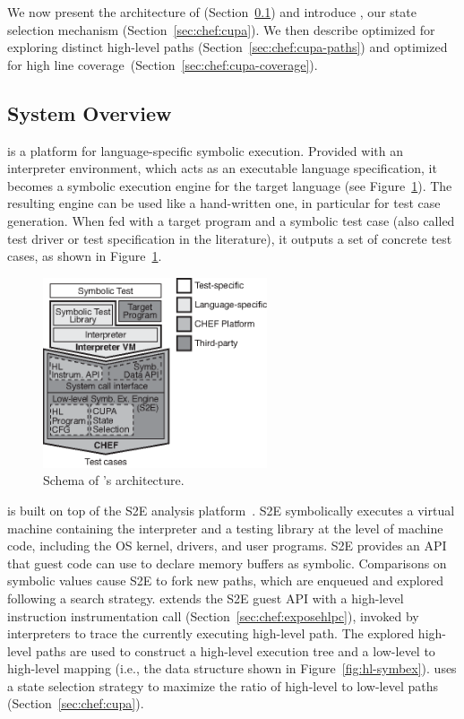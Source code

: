 We now present the architecture of \chef (Section~\ref{sec:chef:architecture}) and introduce \cupa, our state selection mechanism (Section~\ref{sec:chef:cupa}). We then describe \cupa optimized for exploring distinct high-level paths (Section~\ref{sec:chef:cupa-paths}) and optimized for high line coverage~(Section~\ref{sec:chef:cupa-coverage}).

\subsection{System Overview}
\label{sec:chef:architecture}

\chef is a platform for language-specific symbolic execution. Provided with an interpreter environment, which acts as an executable language specification, it becomes a symbolic execution engine for the target language (see Figure~\ref{fig:system-arch}).
%
The resulting engine can be used like a hand-written one, in particular for test case generation. When fed with a target program and a symbolic test case (also called test driver or test specification in the literature), it outputs a set of concrete test cases, as shown in Figure~\ref{fig:system-arch}.

\begin{figure}
  \centering
  \includegraphics[width=2.6in]{figures/chef/system-arch}
  \caption{Schema of \chef's architecture.}
  \label{fig:system-arch}
\end{figure}

\chef is built on top of the S2E analysis platform~\cite{s2eSystem}. S2E symbolically executes a virtual machine containing the interpreter and a testing library at the level of machine code,  including the OS kernel, drivers, and user programs.  S2E provides an API that guest code can use to declare memory buffers as symbolic. Comparisons on symbolic values cause S2E to fork new paths, which are enqueued and explored following a search strategy.
%
\chef extends the S2E guest API with a high-level instruction instrumentation call (Section~\ref{sec:chef:exposehlpc}), invoked by interpreters to trace the currently executing high-level path.  The explored high-level paths are used to construct a high-level execution tree and a low-level to high-level mapping (i.e., the data structure shown in Figure~\ref{fig:hl-symbex}).  \chef uses a state selection strategy to maximize the ratio of high-level to low-level paths (Section~\ref{sec:chef:cupa}).

